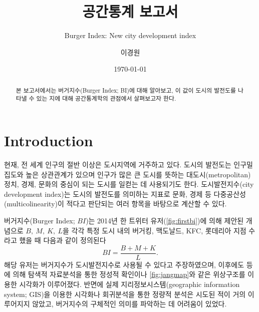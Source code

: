 \documentclass{scrartcl}
\begin{document}
\title{공간통계 보고서}
\subtitle{Burger Index: New city development index}
\author{이경원}
\date{\today}
\maketitle


\begin{abstract}
    본 보고서에서는 버거지수(Burger Index; BI)에 대해 알아보고, 이 값이 도시의 발전도를 나타낼 수 있는 지에 대해 공간통계학의 관점에서 살펴보고자 한다. 
\end{abstract}

\section{Introduction}   

현재, 전 세계 인구의 절반 이상은 도시지역에 거주하고 있다. 도시의 발전도는 인구밀집도와 높은 상관관계가 있으며 인구가 많은 큰 도시를 뜻하는 대도시(metropolitan)\가 정치, 경제, 문화의 중심이 되는 도시를 일컫는 데 사용되기도 한다. 도시발전지수(city development index)는 도시의 발전도를 의미하는 지표로 문화, 경제 등 다중공산성(multicolinearity)이 적다고 판단되는 여러 항목을 바탕으로 계산할 수 있다. 

버거지수(Burger Index; $BI$)는 2014년 한 트위터 유저(\autoref{fig:firstbi})에 의해 제안된 개념으로 $B,~M,~K,~L$을 각각 특정 도시 내의 버거킹, 맥도날드, KFC, 롯데리아 지점 수라고 했을 때 다음과 같이 정의된다
\begin{equation}\label{eqn:originbi}
    BI = \frac{B+M+K}{L}.
\end{equation}
해당 유저는 버거지수가 도시발전지수로 사용될 수 있다고 주장하였으며, 이후에도 \citet{jang2014} 등에 의해 탐색적 자료분석을 통한 정성적 확인이나 \autoref{fig:jangmap}와 같은 위상구조를 이용한 시각화가 이루어졌다. 반면에 실제 지리정보시스템(geographic information system; GIS)을 이용한 시각화나 회귀분석을 통한 정량적 분석은 시도된 적이 거의 이루어지지 않았고, 버거지수의 구체적인 의미를 파악하는 데 어려움이 있었다.
\end{document}
